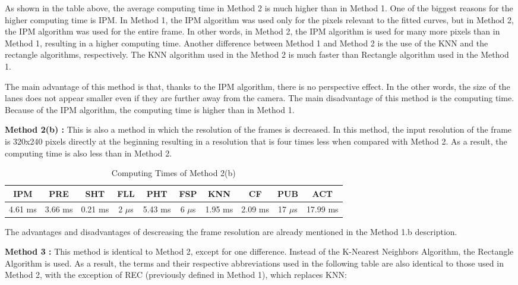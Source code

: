 As shown in the table above, the average computing time in Method 2 is much higher than in Method 1. One of the biggest reasons for the higher computing time is IPM. In Method 1, the IPM algorithm was used only for the pixels relevant to the fitted curves, but in Method 2, the IPM algorithm was used for the entire frame. In other words, in Method 2, the IPM algorithm is used for many more pixels than in Method 1, resulting in a higher computing time. Another difference between Method 1 and Method 2 is the use of the KNN and the rectangle algorithms, respectively. The KNN algorithm used in the Method 2 is much faster than Rectangle algorithm used in the Method 1.

The main advantage of this method is that, thanks to the IPM algorithm, there is no perspective
effect. In the other words, the size of the lanes does not appear smaller even if they are further away from the camera. The main disadvantage of this method is the computing time. Because of the IPM algorithm, the computing time is higher than in Method 1.



\textbf{Method 2(b) : }This is also a method in which the resolution of the frames is decreased. In this method, the input resolution of the frame is 320x240 pixels directly at the beginning resulting in a resolution that is four times less when compared with Method 2. As a result, the computing time is also less than in Method 2.


\begin{table}[ht]
\caption{Computing Times of Method 2(b)} 
\centering 
  \begin{tabular}{ | c | c | c | c | c | c | c | c | c | c |}
    \hline
  
  IPM 		& PRE 		& SHT	   & FLL 	   & PHT 	   & FSP 	    & KNN 	   & CF 	  & PUB 	& ACT \\ \hline  
  4.61 ms   &  3.66 ms  &  0.21 ms  &  2 $\mu$s  &  5.43 ms  &  6 $\mu$s &  1.95 ms  &  2.09 ms & 17 $\mu$s & 17.99 ms\\ \hline  
    
    
      \end{tabular}
  \label{tab:Case5_Times}
\end{table}


The advantages and disadvantages of descreasing the frame resolution are already mentioned in the Method 1.b description.




\textbf{Method 3 : }This method is identical to Method 2, except for one difference. Instead of the
K-Nearest Neighbors Algorithm, the Rectangle Algorithm is used. As a result, the terms and their respective abbreviations used in the following table are also identical to those used in Method 2, with the exception of REC (previously defined in Method 1), which replaces KNN:


